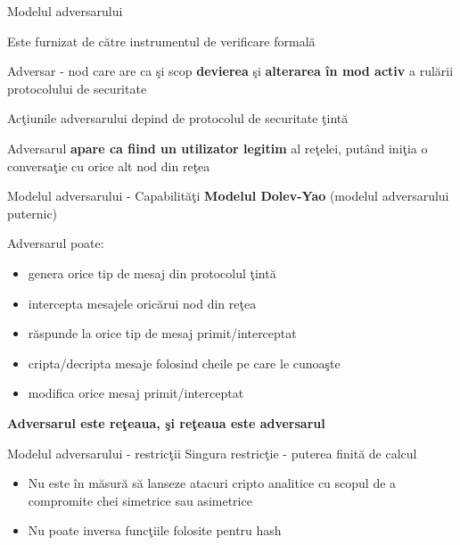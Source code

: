 \documentclass{beamer}
\begin{document}
\begin{frame}{Modelul adversarului}

Este furnizat de către instrumentul de verificare formală

\vspace{0.5cm}

Adversar - nod care are ca şi scop \textbf{devierea} şi \textbf{alterarea în mod activ} a rulării protocolului de securitate

\vspace{0.5cm}

Acţiunile adversarului depind de protocolul de securitate ţintă

\vspace{0.5cm}

Adversarul \textbf{apare ca fiind un utilizator legitim} al reţelei, putând iniţia o conversaţie cu orice alt nod din reţea

\end{frame}



\begin{frame}{Modelul adversarului - Capabilităţi}
\textbf{Modelul Dolev-Yao} (modelul adversarului puternic) 

\vspace{0.5cm}

Adversarul poate:
\begin{itemize}
\item
genera orice tip de mesaj din protocolul ţintă
\item
intercepta mesajele oricărui nod din reţea
\item
răspunde la orice tip de mesaj primit/interceptat
\item
cripta/decripta mesaje folosind cheile pe care le cunoaşte
\item
modifica orice mesaj primit/interceptat
\end{itemize}

\vspace{0.5cm}

\textbf{Adversarul este reţeaua, şi reţeaua este adversarul}

\end{frame}



\begin{frame}{Modelul adversarului - restricţii}
Singura restricţie - puterea finită de calcul

\begin{itemize}
\item
Nu este în măsură să lanseze atacuri cripto analitice cu scopul de a compromite chei simetrice sau asimetrice
\item
Nu poate inversa funcţiile folosite pentru hash
\end{itemize}

\end{frame}
\end{document}
